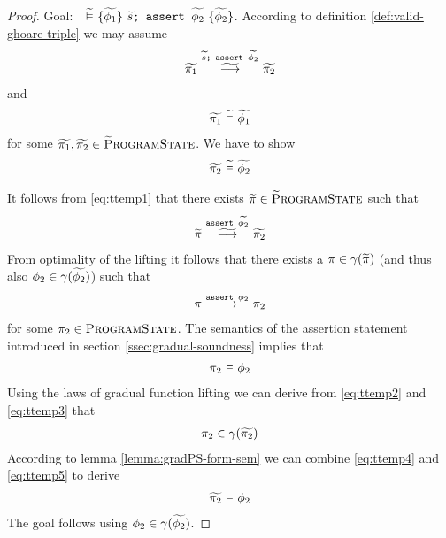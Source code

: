 \begin{proof}
    Goal: ${~} \,\,\widetilde{\vDash}\,\, \{{\widetilde{\phi_1}}\} ~{\textup{\texttt{{$\widetilde{s}$};~{\textup{\texttt{assert $\widetilde{\phi_2}$}}}}}}~ \{{\widetilde{\phi_2}}\}$.
    According to definition \ref{def:valid-ghoare-triple} we may assume
    \begin{align}
    \label{eq:ttemp1}
    \gsstepConsume{\sSeq{$\grad{s}$}{\sAssert{$\grad{\phi_2}$}}}{\grad{\pi_1}}{\grad{\pi_2}}
    \end{align}
    and
    \begin{align}
    \widetilde{\pi_1} \,\,\widetilde{\vDash}\,\, \widetilde{\phi_1}
    \end{align}
    for some $\widetilde{\pi_1}, \widetilde{\pi_2} \in \textup{\textsc{\ensuremath{\widetilde{\text{P}}}rogramState}}$.
    We have to show
    \begin{align}
    \label{eq:ttemp1g}
    \evalgphiGen{\grad{\pi_2}}{\grad{\phi_2}}
    \end{align}
    
    It follows from \ref{eq:ttemp1} that there exists $\widetilde{\pi} \in \textup{\textsc{\ensuremath{\widetilde{\text{P}}}rogramState}}$ such that
    \begin{align}
    \label{eq:ttemp2}
    \gsstepConsume{\sAssert{$\grad{\phi_2}$}}{\grad{\pi}}{\grad{\pi_2}}
    \end{align}
    From optimality of the lifting it follows that there exists a $\pi \in \gamma(\widetilde{\pi})$ (and thus also $\phi_2 \in \gamma(\widetilde{\phi_2})$) such that
    \begin{align}
    \label{eq:ttemp3}
    \sstepConsume{\sAssert{$\phi_2$}}{\pi}{\pi_2}
    \end{align}
    for some $\pi_2 \in \textup{\textsc{ProgramState}}$.
    The semantics of the assertion statement introduced in section \ref{ssec:gradual-soundness} implies that
    \begin{align}
    \label{eq:ttemp4}
    \evalphiGen{\pi_2}{\phi_2}
    \end{align}
    Using the laws of gradual function lifting we can derive from \ref{eq:ttemp2} and \ref{eq:ttemp3} that
    \begin{align}
    \label{eq:ttemp5}
    \pi_2 \in \gamma(\grad{\pi_2})
    \end{align}
    According to lemma \ref{lemma:gradPS-form-sem} we can combine \ref{eq:ttemp4} and \ref{eq:ttemp5} to derive
    \begin{align}
    \label{eq:ttemp6}
    \evalphiGen{\grad{\pi_2}}{\phi_2}
    \end{align}
    The goal follows using $\phi_2 \in \gamma(\widetilde{\phi_2})$.
\end{proof}


